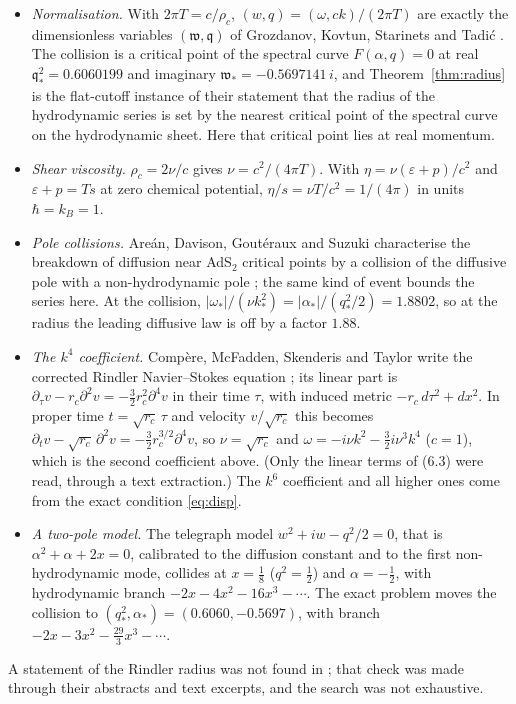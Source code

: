 \begin{itemize}
\item \emph{Normalisation.} With $2\pi T=c/\rho_c$, $(w,q)=(\omega,ck)/(2\pi T)$ are exactly the dimensionless variables $(\mathfrak w,\mathfrak q)$ of Grozdanov, Kovtun, Starinets and Tadić \cite{GKST}. The collision is a critical point of the spectral curve $F(\alpha,q)=0$ at real $\mathfrak q_*^2=0.6060199$ and imaginary $\mathfrak w_*=-0.5697141\,i$, and Theorem~\ref{thm:radius} is the flat-cutoff instance of their statement that the radius of the hydrodynamic series is set by the nearest critical point of the spectral curve on the hydrodynamic sheet. Here that critical point lies at real momentum.
\item \emph{Shear viscosity.} $\rho_c=2\nu/c$ gives $\nu=c^2/(4\pi T)$. With $\eta=\nu(\varepsilon+p)/c^2$ and $\varepsilon+p=Ts$ at zero chemical potential, $\eta/s=\nu T/c^2=1/(4\pi)$ in units $\hbar=k_B=1$.
\item \emph{Pole collisions.} Areán, Davison, Goutéraux and Suzuki characterise the breakdown of diffusion near AdS$_2$ critical points by a collision of the diffusive pole with a non-hydrodynamic pole \cite{ADGS}; the same kind of event bounds the series here. At the collision, $|\omega_*|/(\nu k_*^2)=|\alpha_*|/(q_*^2/2)=1.8802$, so at the radius the leading diffusive law is off by a factor $1.88$.
\item \emph{The $k^4$ coefficient.} Compère, McFadden, Skenderis and Taylor write the corrected Rindler Navier--Stokes equation \cite[(6.3)]{CMST}; its linear part is $\partial_\tau v-r_c\partial^2v=-\frac32r_c^2\partial^4v$ in their time $\tau$, with induced metric $-r_c\,d\tau^2+dx^2$. In proper time $t=\sqrt{r_c}\,\tau$ and velocity $v/\sqrt{r_c}$ this becomes $\partial_tv-\sqrt{r_c}\,\partial^2v=-\frac32r_c^{3/2}\partial^4v$, so $\nu=\sqrt{r_c}$ and $\omega=-i\nu k^2-\frac32i\nu^3k^4$ ($c=1$), which is the second coefficient above. (Only the linear terms of (6.3) were read, through a text extraction.) The $k^6$ coefficient and all higher ones come from the exact condition \eqref{eq:disp}.
\item \emph{A two-pole model.} The telegraph model $w^2+iw-q^2/2=0$, that is $\alpha^2+\alpha+2x=0$, calibrated to the diffusion constant and to the first non-hydrodynamic mode, collides at $x=\frac18$ ($q^2=\frac12$) and $\alpha=-\frac12$, with hydrodynamic branch $-2x-4x^2-16x^3-\cdots$. The exact problem moves the collision to $(q_*^2,\alpha_*)=(0.6060,-0.5697)$, with branch $-2x-3x^2-\frac{29}3x^3-\cdots$.
\end{itemize}

A statement of the Rindler radius was not found in \cite{BKLS,CMST,MarolfRangamani,GKST,Withers,HSSSW}; that check was made through their abstracts and text excerpts, and the search was not exhaustive.
